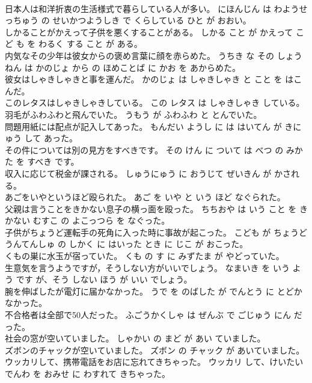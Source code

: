 \documentclass[8pt]{extreport}
\begin{document}
\begin{CJK}{UTF8}{min}
\\	日本人は和洋折衷の生活様式で暮らしている人が多い。	にほんじん は わようせっちゅう の せいかつようしき で くらしている ひと が おおい。	
\\	しかることがかえって子供を悪くすることがある。	しかる こと が かえって こど も を わるく する こと が ある。	
\\	内気なその少年は彼女からの褒め言葉に顔を赤らめた。	うちき な その しょうねん は かのじょ から の ほめことば に かお を あからめた。	
\\	彼女はしゃきしゃきと事を運んだ。	かのじょ は しゃきしゃき と こと を はこんだ。	
\\	このレタスはしゃきしゃきしている。	この レタス は しゃきしゃき している。	
\\	羽毛がふわふわと飛んでいた。	うもう が ふわふわ と とんでいた。	
\\	問題用紙には配点が記入してあった。	もんだい ようし に は はいてん が きにゅう して あった。	
\\	その件については別の見方をすべきです。	その けん に ついて は べつ の みかた を すべき です。	
\\	収入に応じて税金が課される。	しゅうにゅう に おうじて ぜいきん が かされる。	
\\	あごをいやというほど殴られた。	あご を いや と いう ほど なぐられた。	
\\	父親は言うことをきかない息子の横っ面を殴った。	ちちおや は いう こと を きかない むすこ の よこっつら を なぐった。	
\\	子供がちょうど運転手の死角に入った時に事故が起こった。	こども が ちょうど うんてんしゅ の しかく に はいった とき に じこ が おこった。	
\\	くもの巣に水玉が宿っていた。	くも の す に みずたま が やどっていた。	
\\	生意気を言うようですが，そうしない方がいいでしょう。	なまいき を いう よう です が、そう しない ほう が いい でしょう。	
\\	腕を伸ばしたが電灯に届かなかった。	うで を のばした が でんとう に とどかなかった。	
\\	不合格者は全部で50人だった。	ふごうかくしゃ は ぜんぶ で ごじゅう にん だった。	
\\	社会の窓が空いていました。	しゃかい の まど が あい ていました。	
\\	ズボンのチャックが空いていました。	ズボン の チャック が あいていました。	
\\	ウッカリして、携帯電話をお店に忘れてきちゃった。	ウッカリ して、けいたい でんわ を おみせ に わすれて きちゃった。	

\end{CJK}
\end{document}
